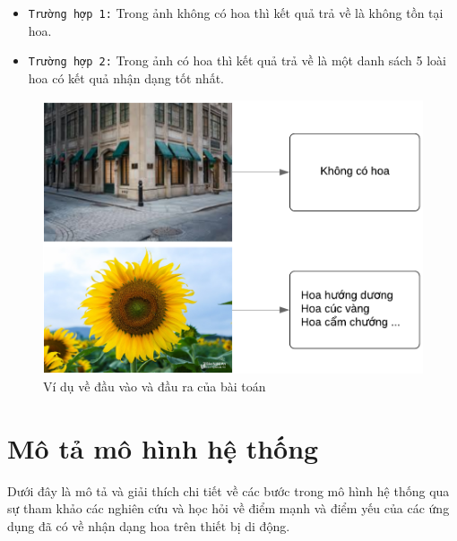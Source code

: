 \documentclass[12pt]{report}
\begin{document}
		\begin{itemize}
			\item \texttt{Trường hợp 1:} Trong ảnh không có hoa thì kết quả trả về là không tồn tại hoa.
			\item \texttt{Trường hợp 2:} Trong ảnh có hoa thì kết quả trả về là một danh sách 5 loài hoa có kết quả nhận dạng tốt nhất.
		\end{itemize}
		\begin{figure}[h]
			\centering
			\includegraphics[scale=0.4]{mota_baitoan}
			\caption{Ví dụ về đầu vào và đầu ra của bài toán}
			\label{fig:mota_baitoan}
		\end{figure}
														
		\section{Mô tả mô hình hệ thống}
		Dưới đây là mô tả và giải thích chi tiết về các bước trong mô hình hệ thống qua sự tham khảo các nghiên cứu \cite{cia-Nilsback06} \cite{cia-Nilsback08} \cite{cia-ONE} \cite{cia-CNNFeatures off-the-shelf} \cite{cia_vgg19} và học hỏi về điểm mạnh và điểm yếu của các ứng dụng đã có về nhận dạng hoa trên thiết bị di động.
														
\end{document}
